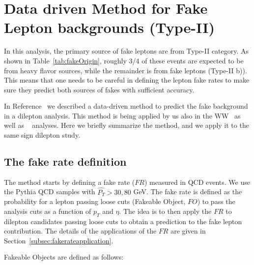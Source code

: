 \section{Data driven Method for Fake Lepton backgrounds (Type-II)}
\label{sec:leptonfake}

In this analysis, the primary source of fake leptons are from Type-II 
category. 
As shown in Table~\ref{tab:fakeOrigin},
roughly 3/4 of these events are expected to be from 
heavy flavor sources, while the remainder is from
fake leptons (Type-II b)). This means that one needs to be careful in defining the lepton fake rates
to make sure they predict both sources of fakes with sufficient accuracy.

In Reference~\cite{fakelep} we described a data-driven method to predict the fake 
background in a dilepton analysis. This method is being applied by us also 
in the WW~\cite{ww} as well as \ttbar ~\cite{ttbar} analyses. Here we briefly
summarize the method, and we apply it to the same sign dilepton study.

\subsection{The fake rate definition}
\label{subsec:fakeratedef}

The method starts by defining a fake rate ($FR$) measured in QCD events. We use 
the Pythia QCD samples with $\hat{P_T} > 30, 80 $ GeV. The fake rate is defined as 
the probability for a lepton passing loose cuts (Fakeable Object, $FO$) to pass the 
analysis cuts as a function of $p_T$ and $\eta$. The idea is to then apply the $FR$ to 
dilepton candidates passing loose cuts to obtain a prediction to the fake lepton contribution. 
The details of the applications of the $FR$ are given in Section~\ref{subsec:fakerateapplication}. 

Fakeable Objects are defined as follows:

